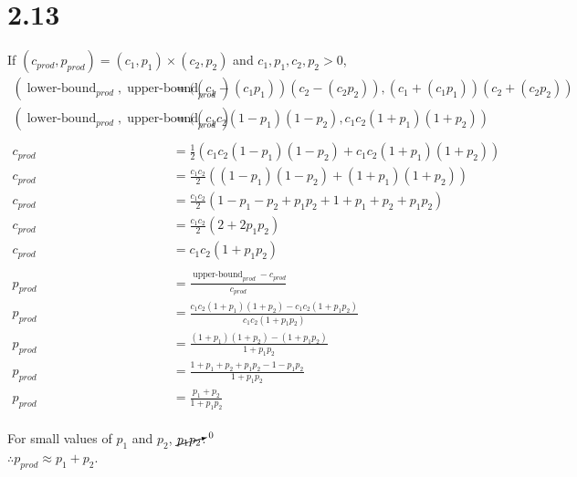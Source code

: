 \documentclass{report}
\newcommand{\?}{\stackrel{?}{=}}
\newcommand{\<}{\stackrel{?}{<}}
\begin{document}
\section*{2.13}


If
$(c_{prod}, p_{prod}) = (c_1, p_1) \times (c_2, p_2)$
and
$c_1, p_1, c_2, p_2 > 0$,\\

\begin{align}
 (\operatorname{lower-bound}_{prod}, \operatorname{upper-bound}_{prod}) &= ((c_1 - (c_1p_1))(c_2 - (c_2p_2)), (c_1 + (c_1p_1))(c_2 + (c_2p_2))\\
 (\operatorname{lower-bound}_{prod}, \operatorname{upper-bound}_{prod}) &= ((c_1c_2(1 - p_1)(1 - p_2), c_1c_2(1 + p_1)(1 + p_2))\\
 \\
  c_{prod} &= \frac{1}{2}(c_1c_2(1-p_1)(1-p_2) + c_1c_2(1+p_1)(1+p_2))\\
 c_{prod} &= \frac{c_1c_2}{2}((1-p_1)(1-p_2) + (1+p_1)(1+p_2))\\
 c_{prod} &= \frac{c_1c_2}{2}(1 - p_1 - p_2 + p_1p_2 + 1 + p_1 + p_2 + p_1p_2)\\
 c_{prod} &= \frac{c_1c_2}{2}(2 +  2p_1p_2)\\
 c_{prod} &= c_1c_2(1 +  p_1p_2)\\
 \\
 p_{prod} &= \frac{\operatorname{upper-bound}_{prod} - c_{prod}}{c_{prod}}\\
 p_{prod} &= \frac{c_1c_2(1 + p_1)(1 + p_2) - c_1c_2(1 +  p_1p_2)}{c_1c_2(1 +  p_1p_2)}\\
 p_{prod} &= \frac{(1 + p_1)(1 + p_2) - (1 +  p_1p_2)}{1 +  p_1p_2}\\
 p_{prod} &= \frac{1 + p_1 + p_2 + p_1p_2 - 1 -  p_1p_2}{1 +  p_1p_2}\\
 p_{prod} &= \frac{p_1 + p_2}{1 + p_1p_2}
\end{align}\\

For small values of $p_1$ and $p_2$, $\cancelto{0}{p_1p_2}$.\\
$\therefore p_{prod} \approx p_1 + p_2$.
\end{document}
